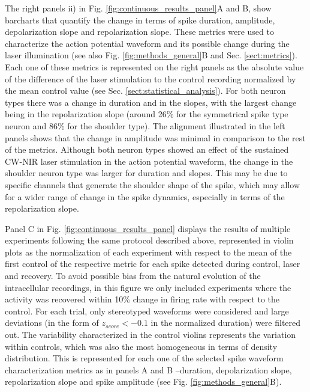 The right panels ii) in Fig. \ref{fig:continuous_results_panel}A and B, show barcharts that quantify the change in terms of spike duration, amplitude, depolarization slope and repolarization slope. These metrics were used to characterize the action potential waveform and its possible change during the laser illumination (see also Fig. \ref{fig:methods_general}B and Sec. \ref{sect:metrics}). Each one of these metrics is represented on the right panels as the absolute value of the difference of the laser stimulation to the control recording normalized by the mean control value (see Sec. \ref{sect:statistical_analysis}). For both neuron types there was a change in duration and in the slopes, with the largest change being in the repolarization slope (around 26\% for the symmetrical spike type neuron and 86\% for the shoulder type). The alignment illustrated in the left panels shows that the change in amplitude was minimal in comparison to the rest of the metrics. Although both neuron types showed an effect of the sustained CW-NIR laser stimulation in the action potential waveform, the change in the shoulder neuron type was larger for duration and slopes. This may be due to specific channels that generate the shoulder shape of the spike, which may allow for a wider range of change in the spike dynamics, especially in terms of the repolarization slope. 


Panel C in Fig. \ref{fig:continuous_results_panel} displays the results of multiple experiments following the same protocol described above, represented in violin plots as the normalization of each experiment with respect to the mean of the first control of the respective metric for each spike detected during control, laser and recovery. To avoid possible bias from the natural evolution of the intracellular recordings, in this figure we only included experiments where the activity was recovered within 10\% change in firing rate with respect to the control. For each trial, only stereotyped waveforms were considered and large deviations (in the form of $z_{score} < -0.1$ in the normalized duration) were filtered out. The variability characterized in the control violins represents the variation within controls, which was also the most homogeneous in terms of density distribution. This is represented for each one of the selected spike waveform characterization metrics as in panels A and B --duration, depolarization slope, repolarization slope and spike amplitude (see Fig. \ref{fig:methods_general}B).

